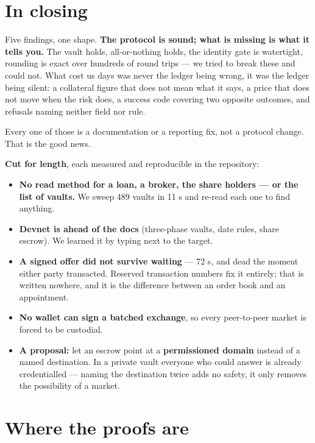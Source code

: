 \documentclass[10pt,a4paper]{article}
\begin{document}
\section*{In closing}

Five findings, one shape. \textbf{The protocol is sound; what is missing is what it tells you.} The vault holds, all-or-nothing holds, the identity gate is watertight, rounding is exact over hundreds of round trips --- we tried to break these and could not. What cost us days was never the ledger being wrong, it was the ledger being silent: a collateral figure that does not mean what it says, a price that does not move when the risk does, a success code covering two opposite outcomes, and refusals naming neither field nor rule.

Every one of those is a documentation or a reporting fix, not a protocol change. That is the good news.

\textbf{Cut for length}, each measured and reproducible in the repository:

\begin{itemize}
  \item \textbf{No read method for a loan, a broker, the share holders --- or the list of vaults.} We sweep 489 vaults in 11 s and re-read each one to find anything.
  \item \textbf{Devnet is ahead of the docs} (three-phase vaults, date rules, share escrow). We learned it by typing next to the target.
  \item \textbf{A signed offer did not survive waiting} --- 72 s, and dead the moment either party transacted. Reserved transaction numbers fix it entirely; that is written nowhere, and it is the difference between an order book and an appointment.
  \item \textbf{No wallet can sign a batched exchange}, so every peer-to-peer market is forced to be custodial.
  \item \textbf{A proposal:} let an escrow point at a \textbf{permissioned domain} instead of a named destination. In a private vault everyone who could answer is already credentialled --- naming the destination twice adds no safety, it only removes the possibility of a market.
\end{itemize}

\vspace{4pt}

\section*{Where the proofs are}
\end{document}
